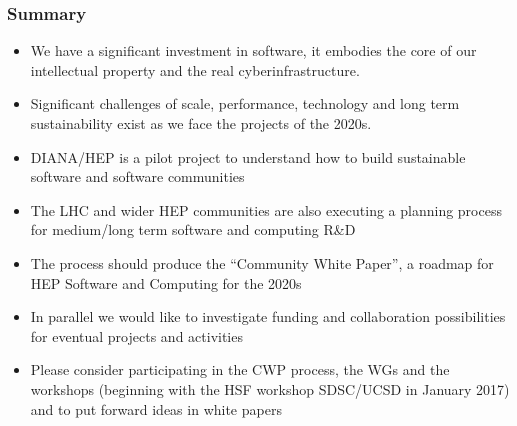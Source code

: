 \begin{frame}
\frametitle{Summary}

\begin{itemize}
\item We have a significant investment in software, it embodies the core of our intellectual property and the real cyberinfrastructure.
\item Significant challenges of scale, performance, technology and long term sustainability exist as we face the projects of the 2020s.
\item DIANA/HEP is a pilot project to understand how to build sustainable software and software communities
\item The LHC and wider HEP communities are also executing a planning process for medium/long term software and computing R\&D
\item The process should produce the ``Community White Paper'', a roadmap for HEP Software and Computing for the 2020s
\item In parallel we would like to investigate funding and collaboration possibilities for eventual projects and activities
\item Please consider participating in the CWP process, the WGs and the workshops (beginning with the HSF workshop SDSC/UCSD in January 2017) and to put forward ideas in white papers
\end{itemize}

\end{frame}


